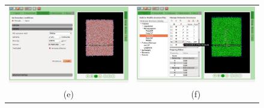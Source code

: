 \documentclass{article}
\begin{document}
\begin{figure}
\begin{center}
\begin{tabular}{cc}
       \includegraphics[scale=0.20]{05-Solvate.png} &\includegraphics[scale=0.20]{06-Fixing.png}\\
     (e) & (f) \\

\end{tabular}
\end{center}
\end{figure}
\end{document}
